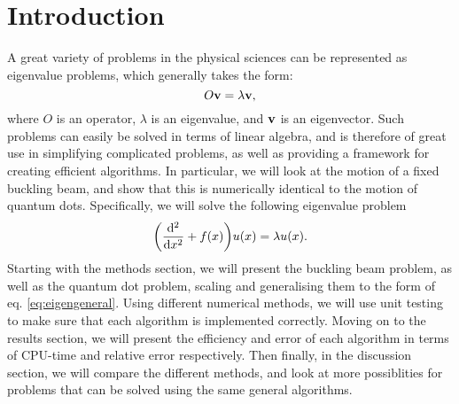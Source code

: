 \section{Introduction}
\label{sec:introduction}

A great variety of problems in the physical sciences can be represented as
eigenvalue problems, which generally takes the form:
  \begin{equation}
    \label{eq:eigengeneral}
    O\vb{v} = \lambda \vb{v},
  \end{equation}
where $O$ is an operator, $\lambda$ is an eigenvalue, and $\vb{v}$ is an eigenvector.
Such problems can easily be solved in terms of linear algebra, and is therefore
of great use in simplifying complicated problems, as well as providing a framework for creating efficient
algorithms.
In particular, we will look at the motion of a fixed buckling beam, and show that this is numerically
identical to the motion of quantum dots. Specifically, we will solve the following
eigenvalue problem
  \begin{equation}
  \label{eq:eigenspecial}
    \qty(\dv[2]{}{x} + f\qty(x))u\qty(x) = \lambda u\qty(x).
  \end{equation}
Starting with the methods section, we will present the buckling beam problem, as well
as the quantum dot problem, scaling and generalising them to the form of eq. \ref{eq:eigengeneral}.
Using different numerical methods, we will use unit testing to make sure that each
algorithm is implemented correctly.
Moving on to the results section, we will present the efficiency and error of each
algorithm in terms of CPU-time and relative error respectively. Then finally,
in the discussion section, we will compare the different methods, and look at
more possiblities for problems that can be solved using the same general algorithms.
